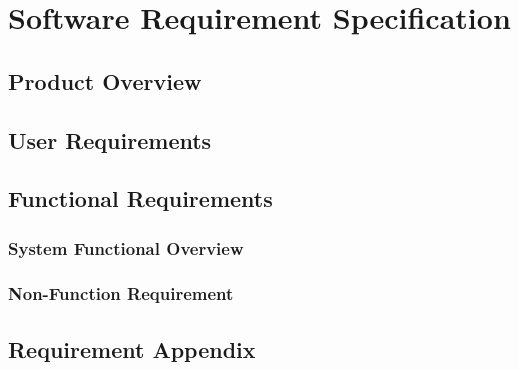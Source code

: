 \chapter{Software Requirement Specification}

\section{Product Overview}


\section{User Requirements}



\section{Functional Requirements}
\subsection{System Functional Overview}










\subsection{Non-Function Requirement}









\section{Requirement Appendix}





